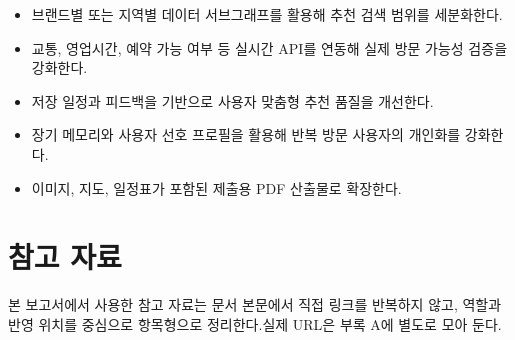 \documentclass[12pt,a4paper]{article}
\newcommand{\DocNeedspace}[1]{\par\ifdim\dimexpr\pagegoal-\pagetotal\relax<#1\newpage\fi}
\newcommand{\TocNoChildTight}{\vspace{-0.28em}}
\begin{document}
\begin{itemize}
\item 브랜드별 또는 지역별 데이터 서브그래프를 활용해 추천 검색 범위를 세분화한다.
\item 교통, 영업시간, 예약 가능 여부 등 실시간 API를 연동해 실제 방문 가능성 검증을 강화한다.
\item 저장 일정과 피드백을 기반으로 사용자 맞춤형 추천 품질을 개선한다.
\item 장기 메모리와 사용자 선호 프로필을 활용해 반복 방문 사용자의 개인화를 강화한다.
\item 이미지, 지도, 일정표가 포함된 제출용 PDF 산출물로 확장한다.
\end{itemize}


\newpage

\DocNeedspace{10\baselineskip}
\section*{참고 자료}
\addtocontents{toc}{\protect\TocNoChildTight}


\DocNeedspace{3\baselineskip}
본 보고서에서 사용한 참고 자료는 문서 본문에서 직접 링크를 반복하지 않고, 역할과 반영 위치를 중심으로 항목형으로 정리한다.\newline 실제 URL은 부록 A에 별도로 모아 둔다.
\end{document}
